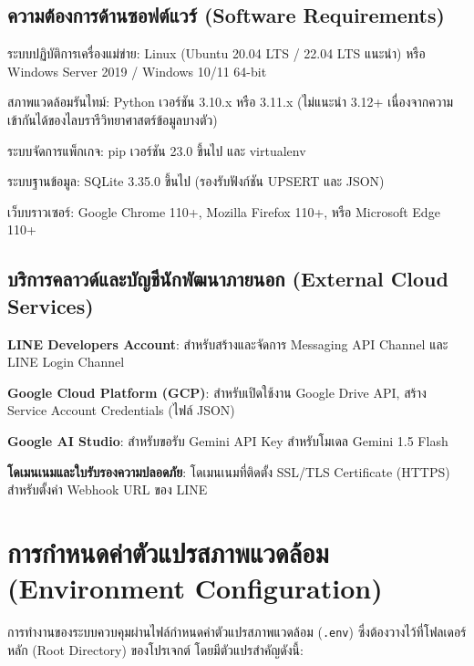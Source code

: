 \subsection{ความต้องการด้านซอฟต์แวร์ (Software Requirements)}
\begin{mycustomitem}
\item ระบบปฏิบัติการเครื่องแม่ข่าย: Linux (Ubuntu 20.04 LTS / 22.04 LTS แนะนำ) หรือ Windows Server 2019 / Windows 10/11 64-bit
\item สภาพแวดล้อมรันไทม์: Python เวอร์ชัน 3.10.x หรือ 3.11.x (ไม่แนะนำ 3.12+ เนื่องจากความเข้ากันได้ของไลบรารีวิทยาศาสตร์ข้อมูลบางตัว)
\item ระบบจัดการแพ็กเกจ: pip เวอร์ชัน 23.0 ขึ้นไป และ virtualenv
\item ระบบฐานข้อมูล: SQLite 3.35.0 ขึ้นไป (รองรับฟังก์ชัน UPSERT และ JSON)
\item เว็บบราวเซอร์: Google Chrome 110+, Mozilla Firefox 110+, หรือ Microsoft Edge 110+
\end{mycustomitem}

\subsection{บริการคลาวด์และบัญชีนักพัฒนาภายนอก (External Cloud Services)}
\begin{mycustomitem}
\item \textbf{LINE Developers Account}: สำหรับสร้างและจัดการ Messaging API Channel และ LINE Login Channel
\item \textbf{Google Cloud Platform (GCP)}: สำหรับเปิดใช้งาน Google Drive API, สร้าง Service Account Credentials (ไฟล์ JSON)
\item \textbf{Google AI Studio}: สำหรับขอรับ Gemini API Key สำหรับโมเดล Gemini 1.5 Flash
\item \textbf{โดเมนเนมและใบรับรองความปลอดภัย}: โดเมนเนมที่ติดตั้ง SSL/TLS Certificate (HTTPS) สำหรับตั้งค่า Webhook URL ของ LINE
\end{mycustomitem}

\section{การกำหนดค่าตัวแปรสภาพแวดล้อม (Environment Configuration)}
\hspace*{1.3em}
การทำงานของระบบควบคุมผ่านไฟล์กำหนดค่าตัวแปรสภาพแวดล้อม (\texttt{.env}) ซึ่งต้องวางไว้ที่โฟลเดอร์หลัก (Root Directory) ของโปรเจกต์ โดยมีตัวแปรสำคัญดังนี้:

